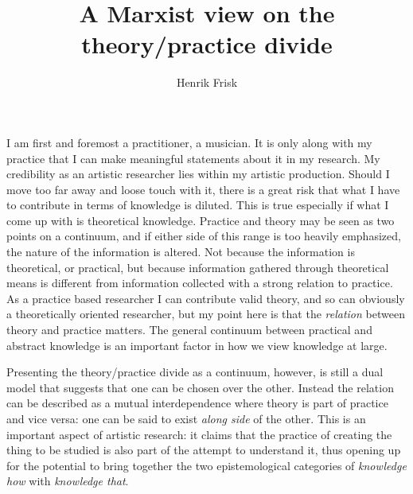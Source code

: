 \documentclass[12pt]{article}
\begin{document}
\title{A Marxist view on the theory/practice divide}
\author{Henrik Frisk}
\date{}

\maketitle


\onehalfspacing
\noindent
I am first and foremost a practitioner, a musician. It is only along with my practice that I can make meaningful statements about it in my research. My credibility as an artistic researcher lies within my artistic production. Should I move too far away and loose touch with it, there is a great risk that what I have to contribute in terms of knowledge is diluted. This is true especially if what I come up with is theoretical knowledge. Practice and theory may be seen as two points on a continuum, and if either side of this range is too heavily emphasized, the nature of the information is altered. Not because the information is theoretical, or practical, but because information gathered through theoretical means is different from information collected with a strong relation to practice. As a practice based researcher I can contribute valid theory, and so can obviously a theoretically oriented researcher, but my point here is that the \emph{relation} between theory and practice matters. The general continuum between practical and abstract knowledge is an important factor in how we view knowledge at large.

Presenting the theory/practice divide as a continuum, however, is still a dual model that suggests that one can be chosen over the other. Instead the relation can be described as a mutual interdependence where theory is part of practice and vice versa: one can be said to exist \emph{along side} of the other. This is an important aspect of artistic research: it claims that the practice of creating the thing to be studied is also part of the attempt to understand it, thus opening up for the potential to bring together the two epistemological categories of \emph{knowledge how} with \emph{knowledge that}. 
\end{document}

